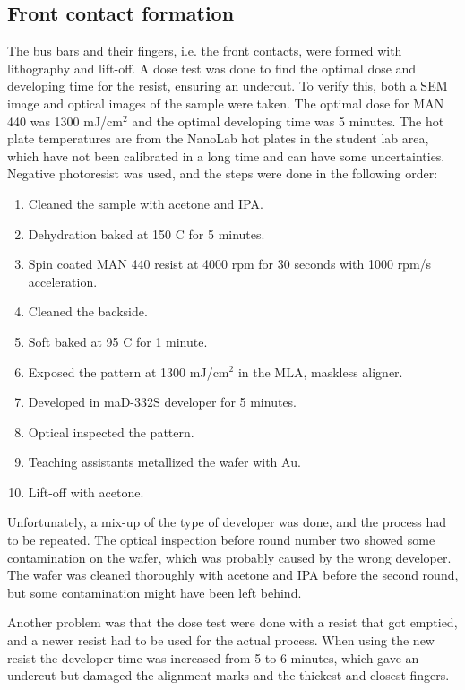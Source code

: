 \subsection{Front contact formation}
\label{methods:front_contact}

The bus bars and their fingers, i.e. the front contacts, were formed with lithography and lift-off.
A dose test was done to find the optimal dose and developing time for the resist, ensuring an undercut.
To verify this, both a SEM image and optical images of the sample were taken.
The optimal dose for MAN 440 was 1300 mJ/cm$^2$ and the optimal developing time was 5 minutes.
The hot plate temperatures are from the NanoLab hot plates in the student lab area, which have not been calibrated in a long time and can have some uncertainties. 
Negative photoresist was used, and the steps were done in the following order:
\begin{enumerate}
    \item Cleaned the sample with acetone and IPA.
    \item Dehydration baked at 150 \textdegree C for 5 minutes.
    \item Spin coated MAN 440 resist at 4000 rpm for 30 seconds with 1000 rpm/s acceleration.
    \item Cleaned the backside.
    \item Soft baked at 95 \textdegree C for 1 minute.
    \item Exposed the pattern at 1300 mJ/cm$^2$ in the MLA, maskless aligner.
    \item Developed in maD-332S developer for 5 minutes.
    \item Optical inspected the pattern.
    \item Teaching assistants metallized the wafer with Au.
    \item Lift-off with acetone.
\end{enumerate}

Unfortunately, a mix-up of the type of developer was done, and the process had to be repeated. 
The optical inspection before round number two showed some contamination on the wafer, which was probably caused by the wrong developer.
The wafer was cleaned thoroughly with acetone and IPA before the second round, but some contamination might have been left behind.

Another problem was that the dose test were done with a resist that got emptied, and a newer resist had to be used for the actual process.
When using the new resist the developer time was increased from 5 to 6 minutes, which gave an undercut but damaged the alignment marks and the thickest and closest fingers.




